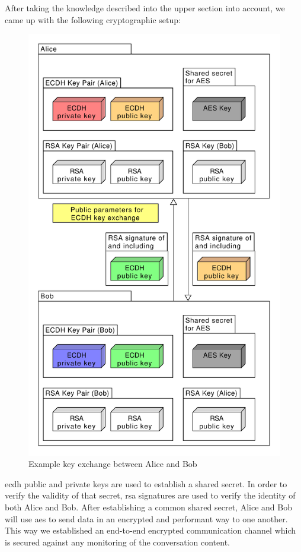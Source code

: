After taking the knowledge described into the upper section into account, we came up with the following cryptographic
setup:

\begin{figure}[H]
    \centering
    \includegraphics[height=.8\textheight]{./graphics/encryption}
    \caption{Example key exchange between Alice and Bob}
    \label{fig:figure45}
\end{figure}

\ac{ecdh} public and private keys are used to establish a shared secret.
In order to verify the validity of that secret, \ac{rsa} signatures are used to verify the identity of both Alice and
Bob.
After establishing a common shared secret, Alice and Bob will use \ac{aes} to send data in an encrypted and performant
way to one another.
This way we established an end-to-end encrypted communication channel which is secured against any monitoring of the
conversation content.
